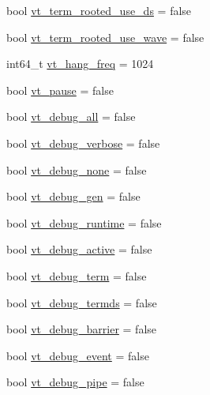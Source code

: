 \begin{DoxyCompactItemize}
\item 
bool \hyperlink{structvt_1_1arguments_1_1_app_config_ae30cd8bb7ca3829fec86f46834a3270c}{vt\+\_\+term\+\_\+rooted\+\_\+use\+\_\+ds} = false
\item 
bool \hyperlink{structvt_1_1arguments_1_1_app_config_ac850fa3db23b49940d9f710c66639189}{vt\+\_\+term\+\_\+rooted\+\_\+use\+\_\+wave} = false
\item 
int64\+\_\+t \hyperlink{structvt_1_1arguments_1_1_app_config_a87132fc94952be73006d525f7d242349}{vt\+\_\+hang\+\_\+freq} = 1024
\item 
bool \hyperlink{structvt_1_1arguments_1_1_app_config_a2064c7bded4e44c59316091cd193afc4}{vt\+\_\+pause} = false
\item 
bool \hyperlink{structvt_1_1arguments_1_1_app_config_aac0dc7123449a6f4f3be90b4ef288ab9}{vt\+\_\+debug\+\_\+all} = false
\item 
bool \hyperlink{structvt_1_1arguments_1_1_app_config_a030b7c9ce9dc27b62819206d83c2ce21}{vt\+\_\+debug\+\_\+verbose} = false
\item 
bool \hyperlink{structvt_1_1arguments_1_1_app_config_a8b2bbece8ab4e091da537b2fc52669ea}{vt\+\_\+debug\+\_\+none} = false
\item 
bool \hyperlink{structvt_1_1arguments_1_1_app_config_a48d69aef2e39db18d9737e8888fd41f2}{vt\+\_\+debug\+\_\+gen} = false
\item 
bool \hyperlink{structvt_1_1arguments_1_1_app_config_a69b1371fb39fa1e541045c04cae8c28f}{vt\+\_\+debug\+\_\+runtime} = false
\item 
bool \hyperlink{structvt_1_1arguments_1_1_app_config_a506408dd0aad49b55666edfc525f8a29}{vt\+\_\+debug\+\_\+active} = false
\item 
bool \hyperlink{structvt_1_1arguments_1_1_app_config_af483dc1bffbd06359d89d937fd819b81}{vt\+\_\+debug\+\_\+term} = false
\item 
bool \hyperlink{structvt_1_1arguments_1_1_app_config_a25e50be9b687d7232a079a81d8e54e69}{vt\+\_\+debug\+\_\+termds} = false
\item 
bool \hyperlink{structvt_1_1arguments_1_1_app_config_a4621fa98bd8bf1e553696895d179fb6e}{vt\+\_\+debug\+\_\+barrier} = false
\item 
bool \hyperlink{structvt_1_1arguments_1_1_app_config_a542629c47a3b06e6f5de13f10bcd1a9b}{vt\+\_\+debug\+\_\+event} = false
\item 
bool \hyperlink{structvt_1_1arguments_1_1_app_config_acdac393e633248619b06c92c8ab37e5a}{vt\+\_\+debug\+\_\+pipe} = false
\item 

\end{DoxyCompactItemize}
